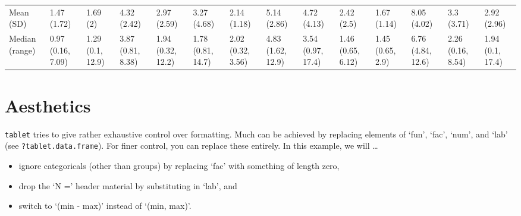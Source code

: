 \documentclass[]{article}
\newenvironment{Shaded}{\begin{snugshade}}{\end{snugshade}}
\newcommand{\DataTypeTok}[1]{\textcolor[rgb]{0.13,0.29,0.53}{#1}}
\newcommand{\KeywordTok}[1]{\textcolor[rgb]{0.13,0.29,0.53}{\textbf{#1}}}
\newcommand{\NormalTok}[1]{#1}
\newcommand{\OperatorTok}[1]{\textcolor[rgb]{0.81,0.36,0.00}{\textbf{#1}}}
\newcommand{\OtherTok}[1]{\textcolor[rgb]{0.56,0.35,0.01}{#1}}
\newcommand{\StringTok}[1]{\textcolor[rgb]{0.31,0.60,0.02}{#1}}
\begin{document}
\begin{table}[H]
{\begin{tabular}[t]{llllllllllllll}
\hspace{1em}Mean (SD) & 1.47 (1.72) & 1.69 (2) & 4.32 (2.42) & 2.97 (2.59) & 3.27 (4.68) & 2.14 (1.18) & 5.14 (2.86) & 4.72 (4.13) & 2.42 (2.5) & 1.67 (1.14) & 8.05 (4.02) & 3.3 (3.71) & 2.92 (2.96)\\
\hspace{1em}Median (range) & 0.97 (0.16, 7.09) & 1.29 (0.1, 12.9) & 3.87 (0.81, 8.38) & 1.94 (0.32, 12.2) & 1.78 (0.81, 14.7) & 2.02 (0.32, 3.56) & 4.83 (1.62, 12.9) & 3.54 (0.97, 17.4) & 1.46 (0.65, 6.12) & 1.45 (0.65, 2.9) & 6.76 (4.84, 12.6) & 2.26 (0.16, 8.54) & 1.94 (0.1, 17.4)\\
\bottomrule
\end{tabular}}
\end{table}

\hypertarget{aesthetics}{%
\section{Aesthetics}\label{aesthetics}}

\texttt{tablet} tries to give rather exhaustive control over formatting.
Much can be achieved by replacing elements of `fun', `fac', `num', and
`lab' (see \texttt{?tablet.data.frame}). For finer control, you can
replace these entirely. In this example, we will \ldots{}

\begin{itemize}
\item
  ignore categoricals (other than groups) by replacing `fac' with
  something of length zero,
\item
  drop the `N =' header material by substituting in `lab', and
\item
  switch to `(min - max)' instead of `(min, max)'.
\end{itemize}

\begin{Shaded}
\end{Shaded}
\end{document}
